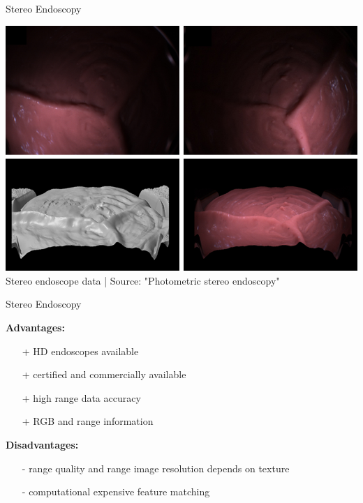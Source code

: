 \begin{frame}{Stereo Endoscopy}

	\begin{center}
		\includegraphics[height=.8\textheight ]{images/stereo1}\\
		\scriptsize Stereo endoscope data | Source:  "Photometric stereo endoscopy"
	\end{center}

\end{frame}



\begin{frame}{Stereo Endoscopy}

	\textbf{Advantages:}
	\begin{itemize}
		\item[+] HD endoscopes available
		\item[+] certified and commercially available
		\item[+] high range data accuracy
		\item[+] RGB and range information
	\end{itemize}
	\vspace{1em}
	\textbf{Disadvantages:}
	\begin{itemize}
		\item[-] range quality and range image resolution depends on texture
		\item[-] computational expensive feature matching
	\end{itemize}

\end{frame}




